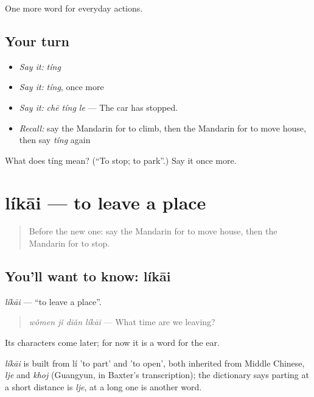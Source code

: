 \begin{grammarlens}[title={What you've built}]
One more word for everyday actions.
\end{grammarlens}

\subsection*{Your turn}
\begin{itemize}
\raggedright
  \item \emph{Say it:} \emph{tíng}
  \item \emph{Say it:} \emph{tíng}, once more
  \item \emph{Say it:} \emph{chē tíng le} — The car has stopped.
  \item \emph{Recall:} say the Mandarin for to climb, then the Mandarin for to move house, then say \emph{tíng} again
\end{itemize}

\begin{tcolorbox}[breakable,colback=teal!4,colframe=teal!35!black,title={Before you move on}]
What does tíng mean? (\textquotedblleft{}To stop; to park\textquotedblright{}.) Say it once more.
\end{tcolorbox}
\section[líkāi]{líkāi — to leave a place}

\label{lesson:ZH-C107-likai}



\begin{quote}
Before the new one: say the Mandarin for to move house, then the Mandarin for to stop.
\end{quote}

\subsection*{You'll want to know: líkāi}
\emph{líkāi} — \textquotedblleft{}to leave a place\textquotedblright{}.

\begin{quote}
\emph{wǒmen jǐ diǎn líkāi} — What time are we leaving?
\end{quote}

Its characters come later; for now it is a word for the ear.

\begin{cousinweb}
\emph{líkāi} is built from lí 'to part' and  'to open', both inherited from Middle Chinese, \emph{lje} and \emph{khoj} (Guangyun, in Baxter's transcription); the dictionary says parting at a short distance is \emph{lje}, at a long one is another word.
\end{cousinweb}

